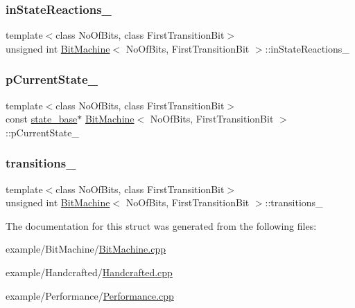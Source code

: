 \subsubsection{\texorpdfstring{in\+State\+Reactions\+\_\+}{inStateReactions\_}}
{\footnotesize\ttfamily template$<$class No\+Of\+Bits, class First\+Transition\+Bit$>$ \\
unsigned int \mbox{\hyperlink{struct_bit_machine}{Bit\+Machine}}$<$ No\+Of\+Bits, First\+Transition\+Bit $>$\+::in\+State\+Reactions\+\_\+\hspace{0.3cm}{\ttfamily [private]}}

\mbox{\label{struct_bit_machine_a22ecd751130c63597ce80ca5c1d9bff3}} 
\subsubsection{\texorpdfstring{p\+Current\+State\+\_\+}{pCurrentState\_}}
{\footnotesize\ttfamily template$<$class No\+Of\+Bits, class First\+Transition\+Bit$>$ \\
const \mbox{\hyperlink{classstate__base}{state\+\_\+base}}$\ast$ \mbox{\hyperlink{struct_bit_machine}{Bit\+Machine}}$<$ No\+Of\+Bits, First\+Transition\+Bit $>$\+::p\+Current\+State\+\_\+\hspace{0.3cm}{\ttfamily [private]}}

\mbox{\label{struct_bit_machine_a042875c3dcc1ff444ddd45df5ca47c56}} 
\subsubsection{\texorpdfstring{transitions\+\_\+}{transitions\_}}
{\footnotesize\ttfamily template$<$class No\+Of\+Bits, class First\+Transition\+Bit$>$ \\
unsigned int \mbox{\hyperlink{struct_bit_machine}{Bit\+Machine}}$<$ No\+Of\+Bits, First\+Transition\+Bit $>$\+::transitions\+\_\+\hspace{0.3cm}{\ttfamily [private]}}



The documentation for this struct was generated from the following files\+:\begin{DoxyCompactItemize}
\item 
example/\+Bit\+Machine/\mbox{\hyperlink{_bit_machine_8cpp}{Bit\+Machine.\+cpp}}\item 
example/\+Handcrafted/\mbox{\hyperlink{_handcrafted_8cpp}{Handcrafted.\+cpp}}\item 
example/\+Performance/\mbox{\hyperlink{_performance_8cpp}{Performance.\+cpp}}\end{DoxyCompactItemize}

